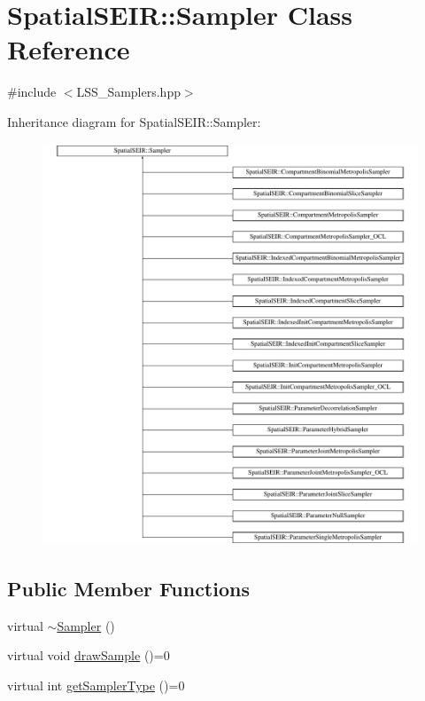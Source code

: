\hypertarget{classSpatialSEIR_1_1Sampler}{\section{Spatial\-S\-E\-I\-R\-:\-:Sampler Class Reference}
\label{classSpatialSEIR_1_1Sampler}
}


{\ttfamily \#include $<$L\-S\-S\-\_\-\-Samplers.\-hpp$>$}

Inheritance diagram for Spatial\-S\-E\-I\-R\-:\-:Sampler\-:\begin{figure}[H]
\begin{center}
\leavevmode
\includegraphics[height=12.000000cm]{classSpatialSEIR_1_1Sampler}
\end{center}
\end{figure}
\subsection*{Public Member Functions}
\begin{DoxyCompactItemize}
\item 
virtual \hyperlink{classSpatialSEIR_1_1Sampler_a2a249720ca17a6ddd53c4f5359cdf739}{$\sim$\-Sampler} ()
\item 
virtual void \hyperlink{classSpatialSEIR_1_1Sampler_aa07a42b26cb62249c20c58e855a08657}{draw\-Sample} ()=0
\item 
virtual int \hyperlink{classSpatialSEIR_1_1Sampler_aaa79310ad809e6aeb25479849f322dda}{get\-Sampler\-Type} ()=0
\end{DoxyCompactItemize}


